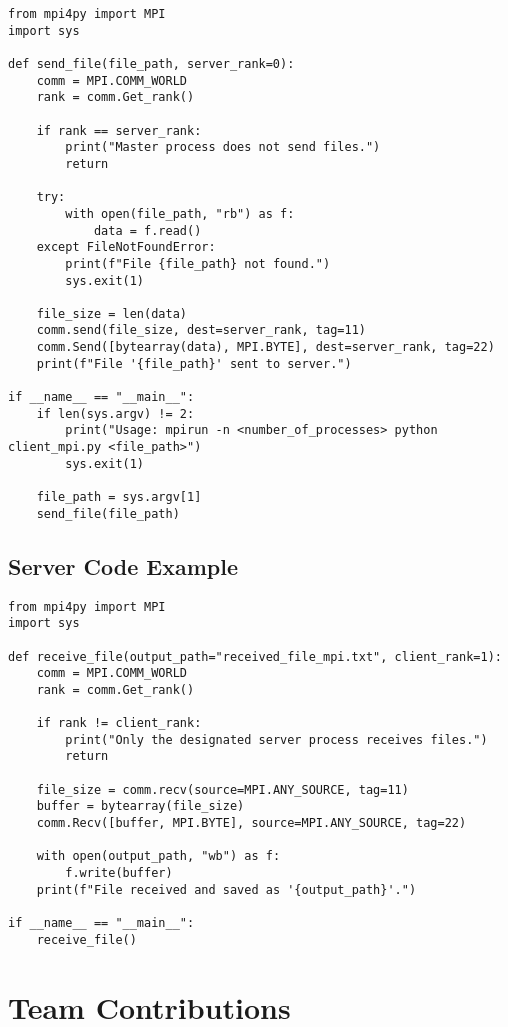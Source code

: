 \documentclass{article}
\begin{document}
\begin{lstlisting}[style=mypython, caption=Client-Side MPI Implementation]
from mpi4py import MPI
import sys

def send_file(file_path, server_rank=0):
    comm = MPI.COMM_WORLD
    rank = comm.Get_rank()

    if rank == server_rank:
        print("Master process does not send files.")
        return

    try:
        with open(file_path, "rb") as f:
            data = f.read()
    except FileNotFoundError:
        print(f"File {file_path} not found.")
        sys.exit(1)

    file_size = len(data)
    comm.send(file_size, dest=server_rank, tag=11)
    comm.Send([bytearray(data), MPI.BYTE], dest=server_rank, tag=22)
    print(f"File '{file_path}' sent to server.")

if __name__ == "__main__":
    if len(sys.argv) != 2:
        print("Usage: mpirun -n <number_of_processes> python client_mpi.py <file_path>")
        sys.exit(1)

    file_path = sys.argv[1]
    send_file(file_path)
\end{lstlisting}

\subsection{Server Code Example}

\begin{lstlisting}[style=mypython, caption=Server-Side MPI Implementation]
from mpi4py import MPI
import sys

def receive_file(output_path="received_file_mpi.txt", client_rank=1):
    comm = MPI.COMM_WORLD
    rank = comm.Get_rank()

    if rank != client_rank:
        print("Only the designated server process receives files.")
        return

    file_size = comm.recv(source=MPI.ANY_SOURCE, tag=11)
    buffer = bytearray(file_size)
    comm.Recv([buffer, MPI.BYTE], source=MPI.ANY_SOURCE, tag=22)

    with open(output_path, "wb") as f:
        f.write(buffer)
    print(f"File received and saved as '{output_path}'.")

if __name__ == "__main__":
    receive_file()
\end{lstlisting}

\section{Team Contributions}
\end{document}
